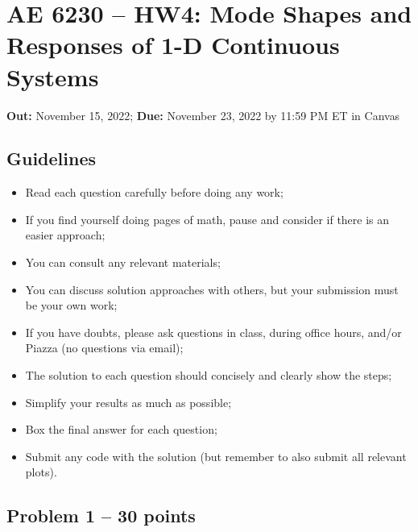 \documentclass[11pt,a4paper]{article}
\begin{document}
	
	

\section*{AE 6230 -- HW4: Mode Shapes and Responses of 1-D Continuous Systems}

\textbf{Out:} November 15, 2022; \textbf{Due:} November 23, 2022 by 11:59 PM ET in Canvas \\

\subsection*{Guidelines}

\begin{itemize}

    \item Read each question carefully before doing any work;

    \item If you find yourself doing pages of math, pause and consider if there is an easier approach;
	
    \item You can consult any relevant materials;
 
    \item You can discuss solution approaches with others, but your submission must be your own work;

    \item If you have doubts, please ask questions in class, during office hours, and/or Piazza (no questions via email);
	
    \item The solution to each question should concisely and clearly show the steps;

    \item Simplify your results as much as possible;

    \item Box the final answer for each question;        

    \item Submit any code with the solution (but remember to also submit all relevant plots).
	
\end{itemize}

\clearpage 

\subsection*{Problem 1 -- 30 points}
\end{document}
